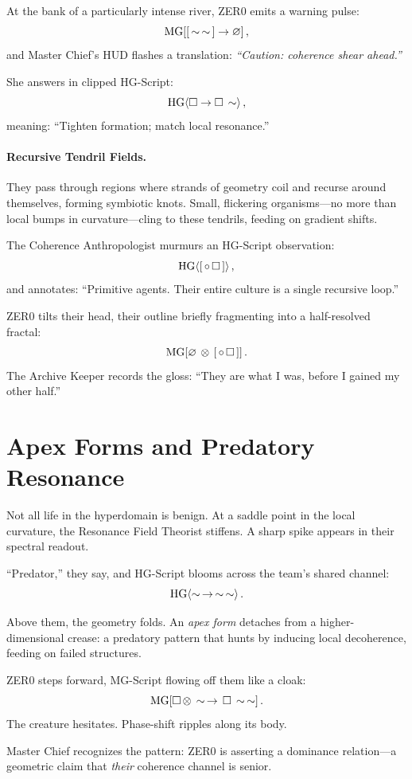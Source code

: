 At the bank of a particularly intense river, ZER0 emits a warning pulse:
\[
\mathrm{MG}\!\left[[\,\sim\,\sim\,] \rightarrow \varnothing\right],
\]
and Master Chief's HUD flashes a translation: \emph{``Caution: coherence shear ahead.''}

She answers in clipped HG-Script:
\[
\mathrm{HG}\!\left\langle\square \rightarrow \square\,\sim\right\rangle,
\]
meaning: ``Tighten formation; match local resonance.''

\paragraph{Recursive Tendril Fields.}
They pass through regions where strands of geometry coil and recurse around themselves, forming
symbiotic knots. Small, flickering organisms---no more than local bumps in curvature---cling to
these tendrils, feeding on gradient shifts.

The Coherence Anthropologist murmurs an HG-Script observation:
\[
\mathrm{HG}\!\left\langle[\,\circ\,\square\,]\right\rangle,
\]
and annotates: ``Primitive agents. Their entire culture is a single recursive loop.''

ZER0 tilts their head, their outline briefly fragmenting into a half-resolved fractal:
\[
\mathrm{MG}\!\left[\varnothing\,\otimes\,[\,\circ\,\square\,]\right].
\]
The Archive Keeper records the gloss: ``They are what I was, before I gained my other half.''

\section{Apex Forms and Predatory Resonance}
Not all life in the hyperdomain is benign. At a saddle point in the local curvature, the Resonance
Field Theorist stiffens. A sharp spike appears in their spectral readout.

``Predator,'' they say, and HG-Script blooms across the team's shared channel:
\[
\mathrm{HG}\!\left\langle\sim\,\rightarrow\,\sim\,\sim\right\rangle.
\]

Above them, the geometry folds. An \emph{apex form} detaches from a higher-dimensional crease: a
predatory pattern that hunts by inducing local decoherence, feeding on failed structures.

ZER0 steps forward, MG-Script flowing off them like a cloak:
\[
\mathrm{MG}\!\left[\square\,\otimes\,\sim\,\rightarrow\,\square\,\sim\,\sim\right].
\]
The creature hesitates. Phase-shift ripples along its body.

Master Chief recognizes the pattern: ZER0 is asserting a dominance relation---a geometric claim
that \emph{their} coherence channel is senior.

